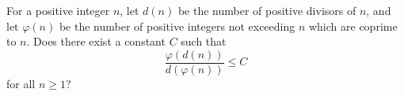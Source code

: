 For a positive integer $n$, let $d(n)$ be the number of positive divisors of $n$, and let $\varphi(n)$ be the number of positive integers not exceeding $n$ which are coprime to $n$. Does there exist a constant $C$ such that
\[
\frac{\varphi(d(n))}{d(\varphi(n))} \leq C
\]
for all $n \geq 1$?
